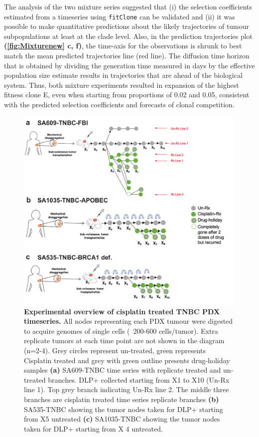 The analysis of the two mixture series suggested that (i) the selection coefficients estimated from a timeseries using \texttt{fitClone} can be validated and (ii) it was possible to make quantitative predictions about the likely trajectories of tumour subpopulations at least at the clade level. Also, in the prediction trajectories plot \textbf{(\autoref{fig:Mixturenew} c, f)}, the time-axis for the observations is shrunk to best match the mean predicted trajectories line (red line). The diffusion time horizon that is obtained by dividing the generation time measured in days by the effective population size estimate results in trajectories that are ahead of the biological system.
Thus, both mixture experiments resulted in expansion of the highest fitness clone E, even when starting from proportions of 0.02 and 0.05, consistent with the predicted selection coefficients and forecasts of clonal competition.

\begin{figure}
\centering
\includegraphics[width=\textwidth]{Figures/chap4/treatedtimeseriesgreen.pdf}

\caption[Experimental overview of TNBC PDX treated time series]
	{\small
	\textbf{Experimental overview of cisplatin treated TNBC PDX timeseries.}
	      All nodes representing each PDX tumour were digested to acquire genomes of single cells (~200-600 cells/tumor). Extra replicate tumors at each time point are not shown in the diagram (n=2-4). Grey circles represent un-treated, green represents Cisplatin treated and grey with green outline presents drug-holiday samples \textbf{(a)} SA609-TNBC time series with replicate treated and un-treated branches. DLP+ collected starting from X1 to X10 (Un-Rx line 1). Top grey branch indicating Un-Rx line 2. The middle three branches are cisplatin treated time series replicate branches \textbf{(b)} SA535-TNBC showing the tumor nodes taken for DLP+ starting from X5 untreated \textbf{(c)} SA1035-TNBC showing the tumor nodes taken for DLP+ starting from X 4 untreated.}
	
	\label{fig:treatedtimeseriesgreen}
\end{figure}


